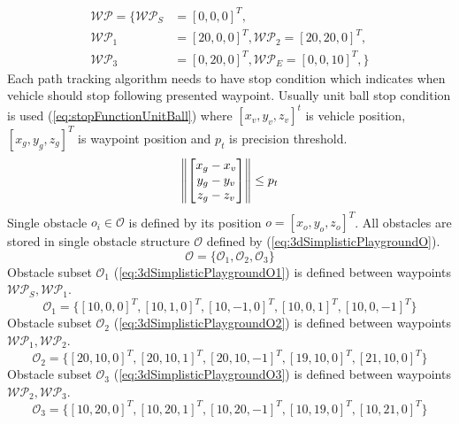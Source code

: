 \begin{equation}\label{eq:playground3DSimpleWPSet}
    \begin{aligned}
          \mathscr{WP} = \{ \mathscr{WP}_S &=[0,0,0]^T,\\
                            \mathscr{WP}_1 &=[20,0,0]^T,
                            \mathscr{WP}_2 =[20,20,0]^T,\\
                            \mathscr{WP}_3 &=[0,20,0]^T,
                            \mathscr{WP}_E =[0,0,10]^T,\}
    \end{aligned}
\end{equation}
\newpage 
\noindent Each path tracking algorithm needs to have stop condition which indicates when vehicle should stop following presented waypoint. Usually unit ball stop condition is used (\ref{eq:stopFunctionUnitBall}) where $[x_v,y_v,z_v]^t$ is vehicle position, $[x_g,y_g,z_g]^T$ is waypoint position and $p_t$ is precision threshold.
\begin{equation}\label{eq:stopFunctionUnitBall}
    \left\lVert\begin{bmatrix}x_g-x_v\\y_g-y_v\\z_g-z_v\end{bmatrix}\right\rVert \le p_t
\end{equation}
Single obstacle $o_i\in\mathscr{O}$ is defined by its position $o=[x_o,y_o,z_o]^T$. All obstacles are stored in single obstacle structure $\mathscr{O}$ defined by (\ref{eq:3dSimplisticPlaygroundO}).
\begin{equation}\label{eq:3dSimplisticPlaygroundO}
    \mathscr{O} = \{\mathscr{O}_1,\mathscr{O}_2,\mathscr{O}_3\}
\end{equation}
Obstacle subset $\mathscr{O}_1$ (\ref{eq:3dSimplisticPlaygroundO1}) is defined between waypoints $\mathscr{WP}_S,\mathscr{WP}_1$.
\begin{equation}\label{eq:3dSimplisticPlaygroundO1}
    \mathscr{O}_1 = \{[10,0,0]^T,[10,1,0]^T,[10,-1,0]^T,[10,0,1]^T,[10,0,-1]^T\}
\end{equation}
Obstacle subset $\mathscr{O}_2$ (\ref{eq:3dSimplisticPlaygroundO2}) is defined between waypoints $\mathscr{WP}_1,\mathscr{WP}_2$.
\begin{equation}\label{eq:3dSimplisticPlaygroundO2}
    \mathscr{O}_2 = \{[20,10,0]^T,[20,10,1]^T,[20,10,-1]^T,[19,10,0]^T,[21,10,0]^T\}
\end{equation}
Obstacle subset $\mathscr{O}_3$ (\ref{eq:3dSimplisticPlaygroundO3}) is defined between waypoints $\mathscr{WP}_2,\mathscr{WP}_3$.
\begin{equation}\label{eq:3dSimplisticPlaygroundO3}
    \mathscr{O}_3 = \{[10,20,0]^T,[10,20,1]^T,[10,20,-1]^T,[10,19,0]^T,[10,21,0]^T\}
\end{equation}

